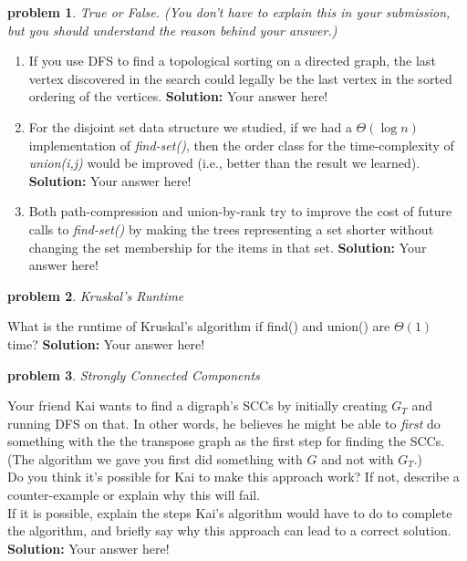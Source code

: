 \documentclass[10pt]{article}
\newcommand{\solution}[1]{\color{blue}\hfill\break\noindent\textbf{Solution:} #1\color{black}}
\newtheorem{problem}{\sc\color{cit}problem}
\begin{document}
\begin{problem} True or False. (You don't have to explain this in your submission, but you should understand the reason behind your answer.)  \end{problem}

\begin{enumerate}
\renewcommand{\theenumi}{\Alph{enumi}}

    \item  If you use DFS to find a topological sorting on a directed graph, the last vertex discovered in the search could legally be the last vertex in the sorted ordering of the vertices.
    \solution{
    Your answer here!
    }
    
    \item For the disjoint set data structure we studied, if we had a $\Theta(\log n)$ implementation of \emph{find-set()}, then the order class for the time-complexity of \emph{union(i,j)} would be improved (i.e., better than the result we learned).
    \solution{
    Your answer here!
    }
    
    \item Both path-compression and union-by-rank try to improve the cost of future calls to \emph{find-set()} by making the trees representing a set shorter without changing the set membership for the items in that set.
    \solution{
    Your answer here!
    }
    
\end{enumerate}

\begin{problem} Kruskal's Runtime \end{problem}
What is the runtime of Kruskal’s algorithm if find() and union() are $\Theta(1)$ time?
\solution{
    Your answer here!
}

\begin{problem} Strongly Connected Components \end{problem}

Your friend Kai wants to find a digraph's SCCs by initially creating $G_T$ and running DFS on that. In other words, he believes he might be able to \textit{first} do something with the the transpose graph as the first step for finding the SCCs. (The algorithm we gave you first did something with $G$ and not with $G_T$.) \\
Do you think it's possible for Kai to make this approach work? If not, describe a counter-example or explain why this will fail. \\
If it is possible, explain the steps Kai's algorithm would have to do to complete the algorithm, and briefly say why this approach can lead to a correct solution.
\solution{
    Your answer here!
}
\end{document}
